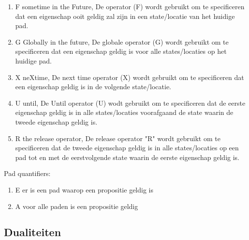 \documentclass{article}
\begin{document}
		\begin{enumerate}
		\item F sometime in the Future,	De operator (F) wordt gebruikt om te specificeren dat een eigenschap ooit geldig zal zijn in een state/locatie van het huidige pad.
		\item G Globally in the future, De globale operator (G) wordt gebruikt om te specificeren dat een eigenschap geldig is voor alle states/locaties op het huidige pad.
		\item X neXtime,  De next time operator (X) wordt gebruikt om te specificeren dat een eigenschap geldig is in de volgende state/locatie.
		\item U until,  De Until operator (U) wodt gebruikt om te specificeren dat de eerste eigenschap geldig is in alle states/locaties voorafgaand de state waarin de tweede eigenschap geldig is.
		\item R the release operator,
		De release operator "R" wordt gebruikt om te specificeren dat de tweede eigenschap geldig is in alle states/locaties op een pad tot en met de eerstvolgende state waarin de eerste eigenschap geldig is.
	\end{enumerate}
	Pad  quantifiers: 
	\begin{enumerate}
		\item E er is een pad waarop een propositie geldig is
		\item A voor alle paden is een propositie geldig
	\end{enumerate}
	\subsection{Dualiteiten}
	
	
\end{document}
